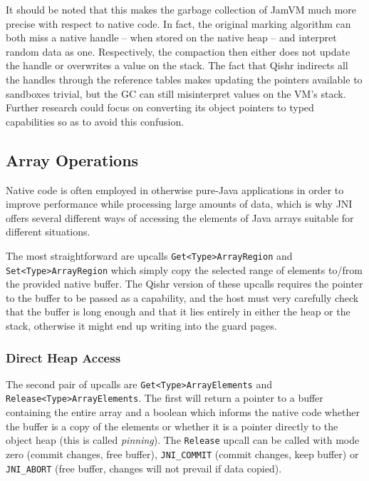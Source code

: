 \documentclass[a4paper,12pt,twoside,openright]{report}
\begin{document}
It should be noted that this makes the garbage collection of JamVM much more precise with respect to native code. In fact, the original marking algorithm can both miss a native handle -- when stored on the native heap -- and interpret random data as one. Respectively, the compaction then either does not update the handle or overwrites a value on the stack. The fact that Qishr indirects all the handles through the reference tables makes updating the pointers available to sandboxes trivial, but the GC can still misinterpret values on the VM's stack. Further research could focus on converting its object pointers to typed capabilities so as to avoid this confusion.

\subsection{Array Operations}

Native code is often employed in otherwise pure-Java applications in order to improve performance while processing large amounts of data, which is why JNI offers several different ways of accessing the elements of Java arrays suitable for different situations.

The most straightforward are upcalls \texttt{Get\-<Type>\-Array\-Region} and \texttt{Set\-<Type>\-Array\-Region} which simply copy the selected range of elements to/from the provided native buffer. The Qishr version of these upcalls requires the pointer to the buffer to be passed as a capability, and the host must very carefully check that the buffer is long enough and that it lies entirely in either the heap or the stack, otherwise it might end up writing into the guard pages. 

\subsubsection{Direct Heap Access}

The second pair of upcalls are \texttt{Get\-<Type>\-Array\-Elements} and \texttt{Release\-<Type>\-Array\-Elements}. The first will return a pointer to a buffer containing the entire array and a boolean which informs the native code whether the buffer is a copy of the elements or whether it is a pointer directly to the object heap (this is called \emph{pinning}). The \texttt{Release} upcall can be called with mode zero (commit changes, free buffer), \texttt{JNI\_COMMIT} (commit changes, keep buffer) or \texttt{JNI\_ABORT} (free buffer, changes will not prevail if data copied). 
\end{document}
